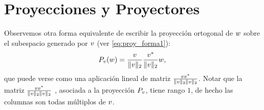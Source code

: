 \section{Proyecciones y Proyectores}
\label{sec:proyectores}
Observemos otra forma equivalente de escribir la proyección ortogonal de $\wb$ sobre el subespacio generado por $\vb$ (ver \eqref{eq:proy_forma1}):
\begin{equation}
 \label{eq:proy_forma2}
 \Pb_{\vb}(\wb)=\frac{\vb}{\|\vb\|_2}\frac{\vb^*}{\|\vb\|_2}\wb,
\end{equation}
que puede verse como una aplicación lineal de matriz  $\frac{\vb\vb^*}{\|\vb\|_2\|\vb\|_2}$.
\tcc
Notar que la matriz $\frac{\vb\vb^*}{\|\vb\|_2\|\vb\|_2}$ , asociada a la proyección $\Pb_{\vb}$, tiene rango $1$, de hecho las columnas son todas múltiplos de $\vb$.
\etcc


